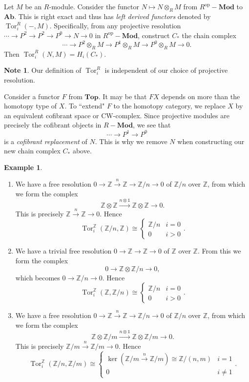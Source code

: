 \documentclass[10pt,letterpaper,cm]{nupset}
\theoremstyle{definition}
\newtheorem{exmp}[definition]{Example}
\newtheorem{note}[definition]{Note}
\theoremstyle{theorem}
\theoremstyle{remark}
\newcommand{\Z}{\mathbb Z}
\newcommand{\1}{\mathbb{1}}
\newcommand{\0}{\vec 0}
\DeclareMathOperator{\tor}{Tor}
\DeclareMathOperator{\op}{op}
\begin{document}
\medskip

Let $M$ be an $R$-module. Consider the functor $N \mapsto N \otimes_R M$ from $R^{\op}{-}\mathbf{Mod}$ to $\mathbf{Ab}$. This is right exact and thus has \textit{left derived functors}  denoted by $\tor_i^R({-}, M)$.  Specifically, from any projective resolution $\cdots \to P^2 \to P^2 \to P^0 \to N\to 0$ in $R^{\op}{-}\mathbf{Mod}$, construct $C_{\ast}$ the chain complex $$\cdots  \to P^2 \otimes_R M\to  P^1 \otimes_R M\to  P^0 \otimes_R M  \to 0.$$ Then $\tor_i^R(N, M) = H_i(C_{\ast}).$
\begin{note}
Our definition of $\tor_i^{R}$ is independent of our choice of projective resolution. 
\end{note}

\smallskip

Consider a functor $F$ from $\mathbf{Top}$. It may be that $FX$ depends on more than the homotopy type of $X$. To ``extend" $F$ to the homotopy category, we replace $X$ by an equivalent cofibrant space or CW-complex. Since projective modules are precisely the cofibrant objects in $R{-}\mathbf{Mod}$, we see that $$ \cdots \to P^1 \to P^0$$ is a \textit{cofibrant replacement} of $N$. This is why we remove $N$ when constructing our new chain complex $C_{\ast}$ above.

\begin{exmp} $ $
\begin{enumerate}
\item We have a free resolution $0 \to \Z \overset{n}{\longrightarrow} \Z \to \Z/n \to 0$ of $\Z/n$ over $\Z$, from which we form the complex $$ \Z \otimes \Z \overset{n \otimes \1}{\longrightarrow} \Z \otimes \Z  \to 0   .$$ This is precisely $ \Z \overset{n}{\longrightarrow} \Z \to 0$. Hence $$\tor_i^{\Z}(\Z/n, \Z) \cong  \begin{cases} \Z/n & i =0 \\ 0 & i >0 \end{cases} .$$
\item We have a trivial free resolution $0 \to \Z \to \Z \to 0$ of $\Z$ over $\Z$. From this we form the complex $$ 0 \to \Z \otimes \Z /n  \to 0, $$ which becomes $0 \to \Z/n \to 0$. Hence $$\tor_i^{\Z}(\Z, \Z/n) \cong  \begin{cases} \Z/n & i =0 \\ 0 & i >0 \end{cases} .$$
\item We have a free resolution $0 \to \Z \overset{n}{\longrightarrow} \Z \to \Z/n \to 0$ of $\Z/n$ over $\Z$, from which we form the complex $$ \Z \otimes \Z/m \overset{n \otimes \1}{\longrightarrow} \Z \otimes \Z/m  \to 0   .$$ This is precisely $ \Z/m \overset{n}{\longrightarrow} \Z/m \to 0$. Hence $$\tor^{\Z}_i(\Z/n, \Z/m) \cong \begin{cases} \ker( \Z/m \overset{n}{\longrightarrow} \Z/m) \cong  \Z/(n,m) & i =1 \\ 0 & i \ne 1 \end{cases}.$$
\end{enumerate}
\end{exmp}
\end{document}
